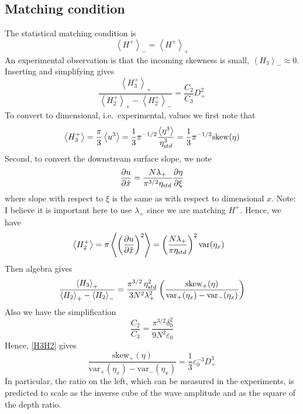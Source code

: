 \documentclass[11pt]{article}
\newcommand{\pd}[2]    { \frac{\partial #1} {\partial #2} }
\newcommand{\mean}[1]{\left< #1 \right>}
\newcommand{\eps}{\varepsilon}
\newcommand{\etastd}{\eta_{\text std}}
\newcommand{\lam}{\lambda}
\newcommand{\lamdn}{\lam_{+}}
\newcommand{\lamfac}{N}
\newcommand{\drat}{D}
\newcommand{\dratdn}{\drat_+}
\newcommand{\skw}{\text{skew}}
\newcommand{\skwdn}{\skw_+}
\newcommand{\var}{\text{var}}
\newcommand{\varup}{\var_-}
\newcommand{\vardn}{\var_+}
\newcommand{\epsup}{\eps_0}
\newcommand{\delup}{\delta_0}
\newcommand{\Ham}{H}
\newcommand{\Hdn}{\Ham^{+}}
\newcommand{\meanup}[1]{\mean{#1}_{-}}
\newcommand{\meandn}[1]{\mean{#1}_{+}}
\begin{document}
\subsection{Matching condition}

The statistical matching condition is
\begin{equation}
\meanup{\Hdn} = \meandn{\Hdn}
\end{equation}
An experimental observation is that the incoming skewness is small, $\meanup{H_3} \approx 0$. Inserting and simplifying gives
\begin{equation}
\label{H3H2}
\frac{\meandn{H_3^+}} {\meandn{H_2^+} - \meanup{H_2^+}} = \frac{C_2}{C_3} \dratdn^2
\end{equation}
To convert to dimensional, i.e.~experimental, values we first note that
\begin{align}
\mean{H_3^+} = \frac{\pi}{3} \mean{u^3} = 
\frac{1}{3} \pi^{-1/2} \frac{\mean{\eta^3}}{\etastd^3} = \frac{1}{3} \pi^{-1/2} \skw(\eta)
\end{align}
Second, to convert the downstream surface slope, we note
\begin{align}
\pd{u}{\tilde{x}} = \frac{\lamfac \lamdn}{\pi^{3/2} \etastd} \pd{\eta}{\xi}
\end{align}
where slope with respect to $\xi$ is the same as with respect to dimensional $x$.
Note: I believe it is important here to use $\lamdn$ since we are matching $\Hdn$.
Hence, we have
\begin{align}
&\mean{H_2^+} = \pi \mean{ \left( \pd{u}{\tilde{x}} \right)^2} = 
\left( \frac{\lamfac \lamdn}{\pi \etastd} \right)^2 \var(\eta_x)
\end{align}
%
Then algebra gives
\begin{equation}
\frac{\meandn{H_3}} {\meandn{H_2} - \meanup{H_2}} = 
\frac{\pi^{3/2} \, \etastd^2} {3 \lamfac^2 \lamdn^2} 
\left( \frac{\skwdn(\eta)} { \vardn(\eta_x) - \varup(\eta_x)} \right)
\end{equation}
Also we have the simplification
\begin{equation}
\frac{C_2}{C_3} = \frac{\pi^{3/2} \delup^2}{9 \lamfac^2 \epsup}
\end{equation}
Hence, \eqref{H3H2} gives
\begin{equation}
\frac{\skwdn(\eta)} {\vardn(\eta_x) - \varup(\eta_x)} = \frac{1}{3} \epsup^{-3} \dratdn^3
\end{equation}
In particular, the ratio on the left, which can be measured in the experiments, is predicted to scale as the inverse cube of the wave amplitude and as the square of the depth ratio.
\end{document}
